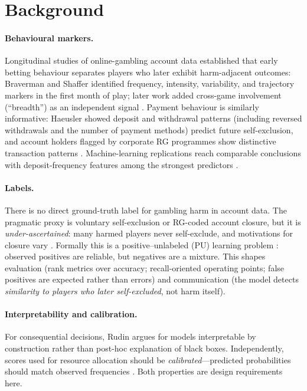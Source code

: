 \documentclass[11pt]{article}
\begin{document}
\section{Background}\label{sec:background}

\paragraph{Behavioural markers.} Longitudinal studies of online-gambling account
data established that early betting behaviour separates players who later exhibit
harm-adjacent outcomes: Braverman and Shaffer \citep{braverman2012} identified
frequency, intensity, variability, and trajectory markers in the first month of play;
later work added cross-game involvement (``breadth'') as an independent signal
\citep{braverman2013,laplante2014}. Payment behaviour is similarly informative:
Haeusler \citep{haeusler2016} showed deposit and withdrawal patterns (including reversed
withdrawals and the number of payment methods) predict future self-exclusion, and
account holders flagged by corporate RG programmes show distinctive transaction
patterns \citep{gray2012}. Machine-learning replications reach comparable conclusions
with deposit-frequency features among the strongest predictors
\citep{percy2016,finkenwirth2021,ukhov2021,hopfgartner2023}.

\paragraph{Labels.} There is no direct ground-truth label for gambling harm in account
data. The pragmatic proxy is voluntary self-exclusion or RG-coded account closure, but
it is \emph{under-ascertained}: many harmed players never self-exclude, and motivations
for closure vary \citep{catania2021}. Formally this is a positive--unlabeled (PU)
learning problem \citep{elkan2008}: observed positives are reliable, but negatives are
a mixture. This shapes evaluation (rank metrics over accuracy; recall-oriented
operating points; false positives are expected rather than errors) and communication
(the model detects \emph{similarity to players who later self-excluded}, not harm
itself).

\paragraph{Interpretability and calibration.} For consequential decisions,
Rudin \citep{rudin2019} argues for models interpretable by construction rather than
post-hoc explanation of black boxes. Independently, scores used for resource allocation should
be \emph{calibrated}---predicted probabilities should match observed frequencies
\citep{platt1999,niculescu2005,guo2017}. Both properties are design requirements here.
\end{document}
